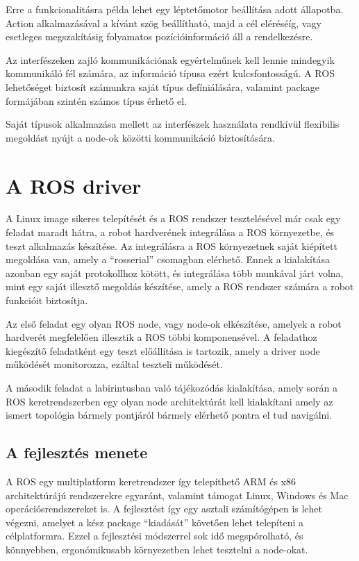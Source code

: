 Erre a funkcionalitásra példa lehet egy léptetőmotor beállítása adott
állapotba. Action alkalmazásával a kívánt szög beállítható, majd a cél eléréséíg,
vagy esetleges megszakításig folyamatos pozícióinformáció áll a rendelkezésre.

\medskip

Az interfészeken zajló kommunikációnak egyértelműnek kell lennie mindegyik
kommunikáló fél számára, az információ típusa ezért kulcsfontosságú. A ROS
lehetőséget biztosít számunkra saját típus defíniálására, valamint package
formájában szintén számos típus érhető el.

Saját típusok alkalmazása mellett az interfészek használata rendkívül flexibilis
megoldást nyújt a node-ok közötti kommunikáció biztosítására. 

\section{A ROS driver}

A Linux image sikeres telepítését és a ROS rendszer tesztelésével már csak egy
feladat maradt hátra, a robot hardverének integrálása a ROS környezetbe, és teszt
alkalmazás készítése. Az integrálásra a ROS környezetnek saját kiépített
megoldása van, amely a ``rosserial'' csomagban elérhető. Ennek a kialakítása
azonban egy saját protokollhoz kötött, és integrálása több munkával járt volna,
mint egy saját illesztő megoldás készítése, amely a ROS rendszer számára a robot
funkcióit biztosítja. 

\medskip

Az első feladat egy olyan ROS node, vagy node-ok elkészítése, amelyek a robot
hardverét megfelelően illesztik a ROS többi komponensével. A feladathoz
kiegészítő feladatként egy teszt előállítása is tartozik, amely a driver node
működését monitorozza, ezáltal teszteli működését.

\medskip

A második feladat a labirintusban való tájékozódás kialakítása, amely során a ROS
keretrendszerben egy olyan node architektúrát kell kialakítani amely az ismert
topológia bármely pontjáról bármely elérhető pontra el tud navigálni.

\subsection{A fejlesztés menete}

A ROS egy multiplatform keretrendszer így telepíthető ARM és x86 architektúrájú
rendszerekre egyaránt, valamint támogat Linux, Windows és Mac
operációsrendszereket is. A fejlesztést így egy asztali számítógépen is lehet
végezni, amelyet a kész package ``kiadását'' követően lehet telepíteni a
célplatformra. Ezzel a fejlesztési módszerrel sok idő megspórolható, és
könnyebben, ergonómikusabb környezetben lehet tesztelni a node-okat.


